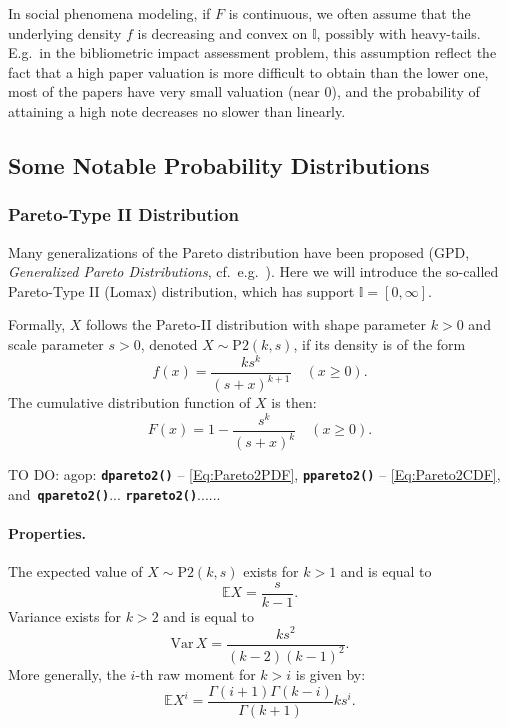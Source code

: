 \documentclass[11pt]{article}\usepackage{graphicx, color}
\newcommand{\hlfunctioncall}[1]{\textcolor[rgb]{0.501960784313725,0,0.329411764705882}{\textbf{#1}}}%
\newcommand{\package}[1]{\textsf{#1}\xspace}
\newcommand{\Rfunc}[1]{\texttt{\hlfunctioncall{#1}}}
\newcommand{\Ival}{\mathbb{I}}
\theoremstyle{remark}
\theoremstyle{definition}
\begin{document}
In social phenomena modeling, if $F$ is continuous,
we often assume that the underlying density $f$ is decreasing
and convex on $\Ival$, possibly with heavy-tails.
E.g.~in the bibliometric impact assessment problem,
this assumption reflect the fact that a high paper valuation
is more difficult to obtain than the lower one,
most of the papers have very small valuation (near $0$),
and the probability of attaining a high note decreases no slower
than linearly.


\subsection{Some Notable Probability Distributions}

\subsubsection{Pareto-Type II Distribution}

Many generalizations of the Pareto distribution
have been proposed (GPD, \textit{Generalized Pareto Distributions},
cf.~e.g.~\cite{VillasenorGonzalez2009:gofgpd,Zhang2010:estgpd}).
Here we will introduce the so-called Pareto-Type II (Lomax) distribution,
which has support $\Ival=[0,\infty]$.


Formally, $X$ follows the Pareto-II distribution
with shape parameter $k>0$ and scale parameter $s>0$, 
denoted $X\sim\mathrm{P2}(k,s)$, if its density is of the form
\begin{equation}\label{Eq:Pareto2PDF}
   f(x)=\frac{k s^k}{(s+x)^{k+1}}\quad (x\ge 0).
\end{equation}
The cumulative distribution function of $X$ is then:
\begin{equation}\label{Eq:Pareto2CDF}
   F(x) = 1-\dfrac{s^k}{(s+x)^k}\quad (x\ge 0).
\end{equation}

TO DO: \package{agop}: \Rfunc{dpareto2()} -- \eqref{Eq:Pareto2PDF},
\Rfunc{ppareto2()} -- \eqref{Eq:Pareto2CDF},
and~\Rfunc{qpareto2()}... \Rfunc{rpareto2()}......

\paragraph{Properties.}
The expected value of $X\sim\mathrm{P2}(k,s)$
exists for $k>1$ and is equal to 
\[\mathbb{E}X = \frac{s}{k-1}.\]
Variance exists for $k>2$ and is equal to
\[\mathrm{Var}\, X = \frac{ks^2}{(k-2)(k-1)^2}.\]
More generally, the $i$-th raw moment for $k>i$ is given by:
\[\mathbb{E}X^i = \frac{\Gamma(i+1)\Gamma(k-i)}{\Gamma(k+1)} ks^i.\]
\end{document}
